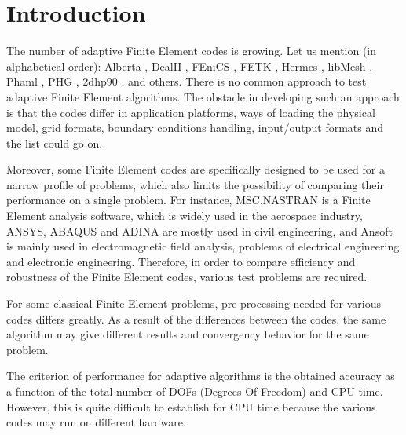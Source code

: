 \section{Introduction}
\label{sec:intro}

The number of adaptive Finite Element codes is growing.
Let us mention (in alphabetical order): Alberta
\cite{alberta}, DealII \cite{dealii}, FEniCS
\cite{fenics}, FETK \cite{fetk}, Hermes \cite{hermes}, 
libMesh \cite{libmesh}, Phaml \cite{phaml}, PHG \cite{phg}, 
2dhp90 \cite{2dhp90}, and others.
There is no common approach to test adaptive 
Finite Element algorithms. The obstacle in developing such an approach is that the codes differ in application platforms, ways of loading the physical model, grid formats, boundary conditions handling, input/output formats and the list could go on.

Moreover, some Finite Element codes are specifically designed to be used for a narrow profile of problems, which also limits the possibility of comparing their performance on a single problem.
For instance, MSC.NASTRAN is a Finite Element analysis software, 
which is widely used in the aerospace industry, ANSYS, ABAQUS and ADINA are 
mostly used in civil engineering, and Ansoft is mainly used in electromagnetic 
field analysis, problems of electrical engineering and electronic engineering. 
Therefore, in order to compare efficiency and robustness of the Finite Element codes, various test problems are required.

For some classical Finite Element problems, pre-processing needed for various codes differs greatly. As a result of the differences between the codes, the same algorithm may give different results and convergency behavior for the same problem.

The criterion of performance for adaptive algorithms is the obtained accuracy as a function of the total number
of DOFs (Degrees Of Freedom) and CPU time. However, this is quite difficult to establish for CPU time because the various codes may run on different hardware.

